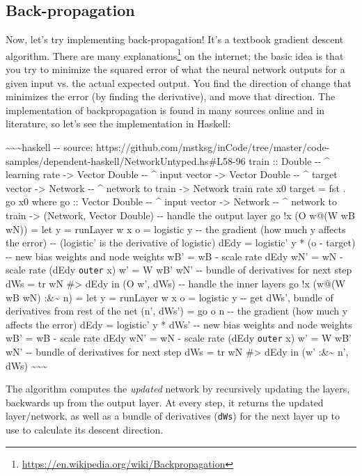 \documentclass[]{article}
\renewcommand{\href}[2]{#2\footnote{\url{#1}}}
\begin{document}
\subsection{Back-propagation}

Now, let's try implementing back-propagation! It's a textbook gradient descent
algorithm. There are \href{https://en.wikipedia.org/wiki/Backpropagation}{many
explanations} on the internet; the basic idea is that you try to minimize the
squared error of what the neural network outputs for a given input vs. the
actual expected output. You find the direction of change that minimizes the
error (by finding the derivative), and move that direction. The implementation
of backpropagation is found in many sources online and in literature, so let's
see the implementation in Haskell:

\textasciitilde{}\textasciitilde{}\textasciitilde{}haskell -\/- source:
https://github.com/mstksg/inCode/tree/master/code-samples/dependent-haskell/NetworkUntyped.hs\#L58-96
train :: Double -\/- \^{} learning rate -\textgreater{} Vector Double -\/- \^{}
input vector -\textgreater{} Vector Double -\/- \^{} target vector
-\textgreater{} Network -\/- \^{} network to train -\textgreater{} Network train
rate x0 target = fst . go x0 where go :: Vector Double -\/- \^{} input vector
-\textgreater{} Network -\/- \^{} network to train -\textgreater{} (Network,
Vector Double) -\/- handle the output layer go !x (O w@(W wB wN)) = let y =
runLayer w x o = logistic y -\/- the gradient (how much y affects the error)
-\/- (logistic' is the derivative of logistic) dEdy = logistic' y * (o - target)
-\/- new bias weights and node weights wB' = wB - scale rate dEdy wN' = wN -
scale rate (dEdy \texttt{outer} x) w' = W wB' wN' -\/- bundle of derivatives for
next step dWs = tr wN \#\textgreater{} dEdy in (O w', dWs) -\/- handle the inner
layers go !x (w@(W wB wN) :\&\textasciitilde{} n) = let y = runLayer w x o =
logistic y -\/- get dWs', bundle of derivatives from rest of the net (n', dWs')
= go o n -\/- the gradient (how much y affects the error) dEdy = logistic' y *
dWs' -\/- new bias weights and node weights wB' = wB - scale rate dEdy wN' = wN
- scale rate (dEdy \texttt{outer} x) w' = W wB' wN' -\/- bundle of derivatives
for next step dWs = tr wN \#\textgreater{} dEdy in (w' :\&\textasciitilde{} n',
dWs) \textasciitilde{}\textasciitilde{}\textasciitilde{}

The algorithm computes the \emph{updated} network by recursively updating the
layers, backwards up from the output layer. At every step, it returns the
updated layer/network, as well as a bundle of derivatives (\texttt{dWs}) for the
next layer up to use to calculate its descent direction.
\end{document}
